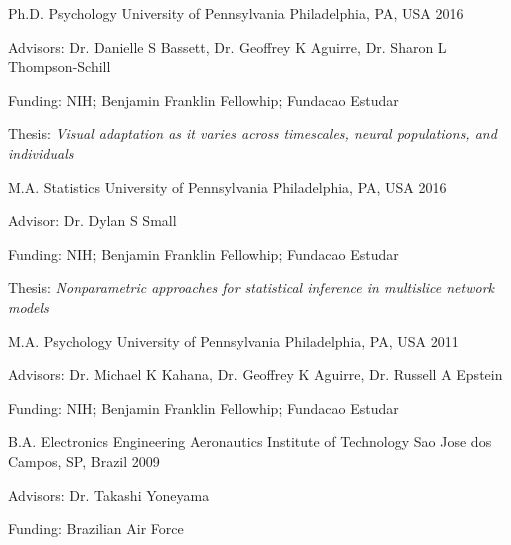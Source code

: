\begin{cventries}
  \cventry
    {Ph.D. Psychology}
    {University of Pennsylvania}
    {Philadelphia, PA, USA}
    {2016}
    {
      \begin{cvitems}
        \item {Advisors: Dr. Danielle S Bassett, Dr. Geoffrey K Aguirre, Dr. Sharon L Thompson-Schill}
        \item {Funding: NIH; Benjamin Franklin Fellowhip; Fundacao Estudar}
        \item {Thesis: \textit{Visual adaptation as it varies across timescales, neural populations, and individuals}}
      \end{cvitems}
    }
  \cventry
    {M.A. Statistics}
    {University of Pennsylvania}
    {Philadelphia, PA, USA}
    {2016}
    {
      \begin{cvitems}
        \item {Advisor: Dr. Dylan S Small}
        \item {Funding: NIH; Benjamin Franklin Fellowhip; Fundacao Estudar}
        \item {Thesis: \textit{Nonparametric approaches for statistical inference in multislice network models}}
      \end{cvitems}
    }
  \cventry
    {M.A. Psychology}
    {University of Pennsylvania}
    {Philadelphia, PA, USA}
    {2011}
    {
      \begin{cvitems}
        \item {Advisors: Dr. Michael K Kahana, Dr. Geoffrey K Aguirre, Dr. Russell A Epstein}
        \item {Funding: NIH; Benjamin Franklin Fellowhip; Fundacao Estudar}
      \end{cvitems}
    }
  \cventry
    {B.A. Electronics Engineering}
    {Aeronautics Institute of Technology}
    {Sao Jose dos Campos, SP, Brazil}
    {2009}
    {
      \begin{cvitems}
        \item {Advisors: Dr. Takashi Yoneyama}
        \item {Funding: Brazilian Air Force}
      \end{cvitems}
    }
\end{cventries}
